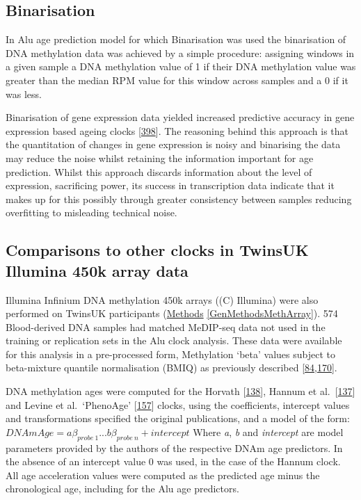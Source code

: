 \documentclass[
]{book}
\begin{document}
\hypertarget{binarisation}{%
\subsection{Binarisation}\label{binarisation}}

In Alu age prediction model for which Binarisation was used the binarisation of DNA methylation data was achieved by a simple procedure: assigning windows in a given sample a DNA methylation value of 1 if their DNA methylation value was greater than the median RPM value for this window across samples and a 0 if it was less.

Binarisation of gene expression data yielded increased predictive accuracy in gene expression based ageing clocks {[}\protect\hyperlink{ref-Meyer2020}{398}{]}.
The reasoning behind this approach is that the quantitation of changes in gene expression is noisy and binarising the data may reduce the noise whilst retaining the information important for age prediction.
Whilst this approach discards information about the level of expression, sacrificing power, its success in transcription data indicate that it makes up for this possibly through greater consistency between samples reducing overfitting to misleading technical noise.

\hypertarget{AluMethodsArrays}{%
\subsection{Comparisons to other clocks in TwinsUK Illumina 450k array data}\label{AluMethodsArrays}}

Illumina Infinium DNA methylation 450k arrays ((C) Illumina) were also performed on TwinsUK participants (\protect\hyperlink{GenMethodsMethArray}{Methods} \ref{GenMethodsMethArray}).
574 Blood-derived DNA samples had matched MeDIP-seq data not used in the training or replication sets in the Alu clock analysis.
These data were available for this analysis in a pre-processed form, Methylation `beta' values subject to beta-mixture quantile normalisation (BMIQ) as previously described {[}\protect\hyperlink{ref-Bell2017a}{84},\protect\hyperlink{ref-Bell2016}{170}{]}.

DNA methylation ages were computed for the Horvath {[}\protect\hyperlink{ref-Horvath2013}{138}{]}, Hannum et al.~{[}\protect\hyperlink{ref-Hannum2013}{137}{]} and Levine et al.~`PhenoAge' {[}\protect\hyperlink{ref-Levine2018}{157}{]} clocks, using the coefficients, intercept values and transformations specified the original publications, and a model of the form:
\(DNAmAge = a\beta_{probe\ 1} ... b\beta_{probe\ n} + intercept\)
Where \emph{a}, \emph{b} and \emph{intercept} are model parameters provided by the authors of the respective DNAm age predictors.
In the absence of an intercept value 0 was used, in the case of the Hannum clock.
All age acceleration values were computed as the predicted age minus the chronological age, including for the Alu age predictors.
\end{document}
